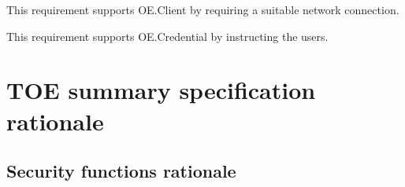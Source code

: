\documentclass[12pt,english]{scrbook}
\begin{document}

This requirement supports OE.Client by requiring a suitable network connection.


This requirement supports OE.Credential by instructing the users.

\newpage

\section{TOE summary specification rationale}

\subsection{Security functions rationale}
\end{document}
